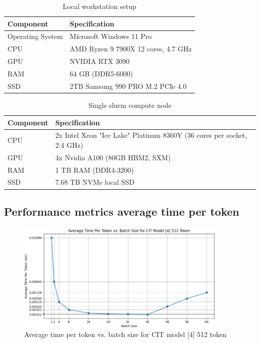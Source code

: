 \begin{table}[H]
    \centering
    \begin{tabularx}{0.90\textwidth}{|X|X|}
    \hline
    \textbf{Component} & \textbf{Specification} \\ \hline
    Operating System & Microsoft Windows 11 Pro \\ \hline
    CPU & AMD Ryzen 9 7900X 12 cores, 4.7 GHz \\ \hline
    GPU & NVIDIA RTX 3090 \\ \hline
    RAM & 64 GB (DDR5-6000) \\ \hline
    SSD & 2TB Samsung 990 PRO M.2 PCIe 4.0 \\ \hline
    \end{tabularx}
    \caption{Local workstation setup}
    \label{table:workstation_setup}
\end{table}
    
\begin{table}[H]
    \centering
    \begin{tabularx}{0.90\textwidth}{|X|X|}
    \hline
    \textbf{Component} & \textbf{Specification} \\ \hline
    CPU & 2x Intel Xeon "Ice Lake" Platinum 8360Y (36 cores per socket, 2.4 GHz) \\ \hline
    GPU & 4x Nvidia A100 (80GB HBM2, SXM) \\ \hline
    RAM & 1 TB RAM (DDR4-3200) \\ \hline
    SSD & 7.68 TB NVMe local SSD \\ \hline
    \end{tabularx}
    \caption{Single slurm compute node}
    \label{table:server_setup}
\end{table}

\newpage

\subsection{Performance metrics average time per token}

\begin{figure}[H]
    \centering
    \includegraphics[width=0.9\textwidth]{imgs/performanceTest.png}
    \caption{Average time per token vs. batch size for CIT model [4] 512 token}
    \label{fig:performanceTest}
\end{figure}

